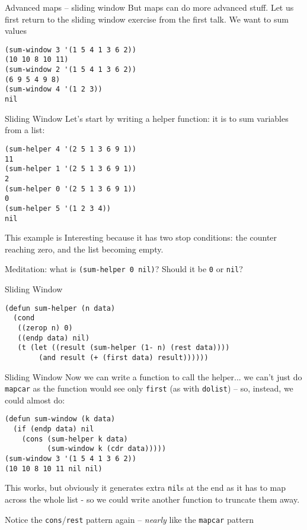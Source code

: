 \documentclass[presentation]{beamer}
\begin{document}
\begin{frame}[fragile]{Advanced maps -- sliding window}
But maps can do more advanced stuff.  Let us first return to the sliding window exercise from the first talk.  We want to sum values
\begin{verbatim}
(sum-window 3 '(1 5 4 1 3 6 2))
(10 10 8 10 11)
(sum-window 2 '(1 5 4 1 3 6 2))
(6 9 5 4 9 8)
(sum-window 4 '(1 2 3))
nil
\end{verbatim}
\end{frame}
\begin{frame}[fragile]{Sliding Window}
Let's start by writing a helper function: it is to sum variables from a list:
\begin{verbatim}
(sum-helper 4 '(2 5 1 3 6 9 1))
11
(sum-helper 1 '(2 5 1 3 6 9 1))
2
(sum-helper 0 '(2 5 1 3 6 9 1))
0
(sum-helper 5 '(1 2 3 4))
nil
\end{verbatim}
This example is Interesting because it has two stop conditions: the counter reaching zero, and the list becoming empty.

\medskip
Meditation: what is \texttt{(sum-helper 0 nil)}?  Should it be \texttt{0} or \texttt{nil}?
\end{frame}
\begin{frame}[fragile]{Sliding Window}
\begin{verbatim}
(defun sum-helper (n data)
  (cond
   ((zerop n) 0)
   ((endp data) nil)
   (t (let ((result (sum-helper (1- n) (rest data))))
        (and result (+ (first data) result))))))
\end{verbatim}
\end{frame}

\begin{frame}[fragile]{Sliding Window}
Now we can write a function to call the helper... we can't just do \texttt{mapcar} as the function would see only \texttt{first} (as with \texttt{dolist}) -- so, instead, we could almost do:
\begin{verbatim}
(defun sum-window (k data)
  (if (endp data) nil
    (cons (sum-helper k data)
          (sum-window k (cdr data)))))
(sum-window 3 '(1 5 4 1 3 6 2))
(10 10 8 10 11 nil nil)
\end{verbatim}
This works, but obviously it generates extra \texttt{nil}s at the end as it has to map across the whole list - so we could write another function to truncate them away.

\medskip
Notice the \texttt{cons}/\texttt{rest} pattern again -- \emph{nearly} like the \texttt{mapcar} pattern
\end{frame}
\end{document}
